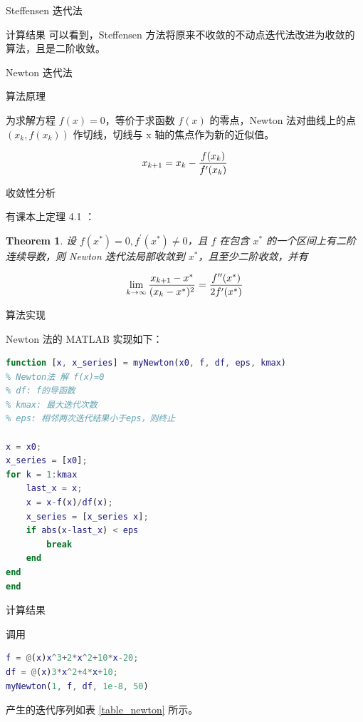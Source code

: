\documentclass[a4paper]{article}
\newtheorem{myThm}{Theorem}
\begin{document}
\begin{multicols}{2}
\begin{section}{Steffensen 迭代法}
\begin{subsection}{计算结果}
		可以看到，Steffensen 方法将原来不收敛的不动点迭代法改进为收敛的算法，且是二阶收敛。
		
	\end{subsection}
	
\end{section}

\begin{section}{Newton 迭代法}

	\begin{subsection}{算法原理}
		
		为求解方程 $f(x)=0$，等价于求函数 $f(x)$ 的零点，Newton 法对曲线上的点 $(x_k, f(x_k))$ 作切线，切线与 x 轴的焦点作为新的近似值。
		
		$$x_{k+1} = x_k - {f(x_k)\over f^\prime(x_{k})}$$
		
	\end{subsection}

	\begin{subsection}{收敛性分析}
		
		有课本上定理 4.1 ：
		
		\begin{myThm}
			设 $f(x^*)=0,f^\prime(x^*) \neq 0$，且 $f$ 在包含 $x^*$ 的一个区间上有二阶连续导数，则 Newton 迭代法局部收敛到 $x^*$，且至少二阶收敛，并有
			
			$$\lim_{k \rightarrow \infty} {x_{k+1}-x^*\over (x_k-x^*)^2} = {f^{\prime\prime}(x^*) \over 2f^\prime(x^*)}$$
		\end{myThm}

	\end{subsection}
	
	\begin{subsection}{算法实现}
	
		Newton 法的 MATLAB 实现如下：
		
		\begin{lstlisting}[language=Matlab]
function [x, x_series] = myNewton(x0, f, df, eps, kmax)
% Newton法 解 f(x)=0
% df: f的导函数
% kmax: 最大迭代次数
% eps: 相邻两次迭代结果小于eps，则终止

x = x0;
x_series = [x0];
for k = 1:kmax
    last_x = x;
    x = x-f(x)/df(x);
    x_series = [x_series x];
    if abs(x-last_x) < eps
        break
    end
end
end
		\end{lstlisting}
		
	\end{subsection}
	
	\begin{subsection}{计算结果}
	
		调用
		\begin{lstlisting}[language=Matlab]
f = @(x)x^3+2*x^2+10*x-20;
df = @(x)3*x^2+4*x+10;
myNewton(1, f, df, 1e-8, 50)
		\end{lstlisting} 产生的迭代序列如表 \ref{table_newton} 所示。
		

\end{subsection}
\end{section}
\end{multicols}
\end{document}
